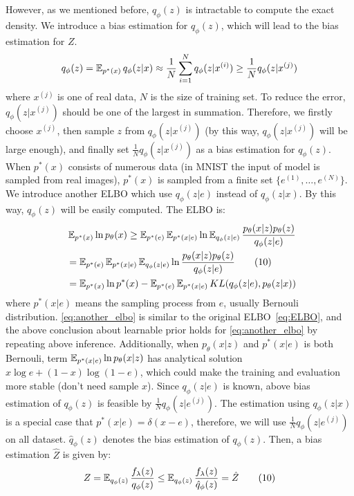 However, as we mentioned before, $q_\phi(z)$ is intractable to compute the exact density. We introduce a bias estimation for $q_\phi(z)$, which will lead to the bias estimation for $Z$. 
\begin{equation*}
	q_\phi(z) = \operatorname{\mathbb{E}}_{p^*(x)} q_\phi(z|x) \approx \frac{1}{N}\sum_{i=1}^N q_\phi(z|x^{(i)}) \geq \frac{1}{N} q_\phi(z|x^{(j)})
\end{equation*}
where $x^{(j)}$ is one of real data, $N$ is the size of training set. To reduce the error, $q_\phi(z|x^{(j)})$ should be one of the largest in summation. Therefore, we firstly choose $x^{(j)}$, then sample $z$ from $q_\phi(z|x^{(j)})$ (by this way, $q_\phi(z|x^{(j)})$ will be large enough), and finally set $\frac{1}{N} q_\phi(z|x^{(j)})$ as a bias estimation for $q_\phi(z)$. When $p^*(x)$ consists of numerous data (\EG in MNIST the input of model is sampled from real images), $p^*(x)$ is sampled from a finite set $\{e^{(1)}, \ldots, e^{(N)}\}$. We introduce another ELBO which use $q_\phi(z|e)$ instead of $q_\phi(z|x)$. By this way, $q_\phi(z)$ will be easily computed. The ELBO is:
\begin{align*}~\label{eq:another_elbo}
	&\operatorname{\mathbb{E}}_{p^*(x)} \ln p_\theta(x) \geq \operatorname{\mathbb{E}}_{p^*(e)} \operatorname{\mathbb{E}}_{p^*(x|e)} \ln \operatorname{\mathbb{E}}_{q_\phi(z|e)} \frac{p_\theta(x|z)p_\theta(z)}{q_\phi(z|e)} \\
	 &= \operatorname{\mathbb{E}}_{p^*(e)} \operatorname{\mathbb{E}}_{p^*(x|e)} \operatorname{\mathbb{E}}_{q_\phi(z|e)} \ln \frac{p_\theta(x|z)p_\theta(z)}{q_\phi(z|e)} \tag{10} \\
	 &= \operatorname{\mathbb{E}}_{p^*(x)} \ln p^*(x) - \operatorname{\mathbb{E}}_{p^*(e)} \operatorname{\mathbb{E}}_{p^*(x|e)} KL(q_\phi(z|e), p_\theta(z|x))
\end{align*} 
where $p^*(x|e)$ means the sampling process from $e$, usually Bernouli distribution. \cref{eq:another_elbo} is similar to the original ELBO~\cref{eq:ELBO}, and the above conclusion about learnable prior holds for \cref{eq:another_elbo} by repeating above inference. Additionally, when $p_\theta(x|z)$ and $p^*(x|e)$ is both Bernouli, term $\operatorname{\mathbb{E}}_{p^*(x|e)} \ln p_\theta(x|z)$ has analytical solution $x\log e+(1-x)\log(1-e)$, which could make the training and evaluation more stable (don't need sample $x$). Since $q_\phi(z|e)$ is known, above bias estimation of $q_\phi(z)$ is feasible by $\frac{1}{N} q_\phi(z|e^{(j)})$. The estimation using $q_\phi(z|x)$ is a special case that $p^*(x|e) = \delta(x - e)$, therefore, we will use $\frac{1}{N} q_\phi(z|e^{(j)})$ on all dataset. $\hat{q}_\phi(z)$ denotes the bias estimation of $q_\phi(z)$. Then, a bias estimation $\hat{Z}$ is given by:
\begin{align*}\label{eq:Z_estimator}
	Z = \operatorname{\mathbb{E}}_{q_\phi(z)}\frac{f_\lambda(z)}{q_\phi(z)} \leq \operatorname{\mathbb{E}}_{q_\phi(z)} \frac{f_\lambda(z)}{\hat{q}_\phi(z)} = \hat{Z} \tag{10}
\end{align*}

